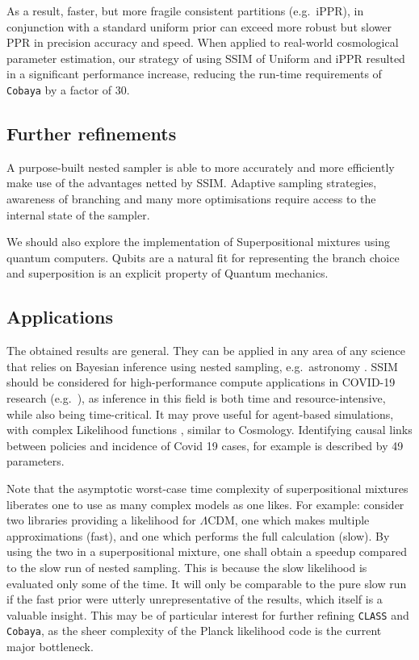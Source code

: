 \documentclass[usenatbib]{mnras}
\begin{document}
As a result, faster, but more fragile consistent partitions
(e.g.~iPPR), in conjunction with a standard uniform prior can exceed
more robust but slower PPR in precision accuracy and speed.  When
applied to real-world cosmological parameter estimation, our strategy
of using SSIM of Uniform and iPPR resulted in a significant
performance increase, reducing the run-time requirements of
\texttt{Cobaya} by a factor of 30.

\subsection{Further refinements}\label{sec:org8314ddf}

A purpose-built nested sampler is able to more accurately and more
efficiently make use of the advantages netted by SSIM. Adaptive
sampling strategies, awareness of branching and many more
optimisations require access to the internal state of the sampler. 

We should also explore the implementation of Superpositional mixtures
using quantum computers. Qubits are a natural fit for representing the
branch choice and superposition is an explicit property of Quantum
mechanics.

\subsection{Applications}\label{sec:applications}
The obtained results are general. They can be applied in any area of
any science that relies on Bayesian inference using nested sampling,
e.g.~astronomy \citep{Casado_2016}. SSIM should be considered for
high-performance compute applications in COVID-19 research
(e.g.~\cite{Covid1,Covid2}), as inference in this field is both time
and resource-intensive, while also being time-critical. It may prove
useful for agent-based simulations, with complex Likelihood functions
\citep{Covid2}, similar to Cosmology. Identifying causal links between
policies and incidence of Covid 19 cases, for example is described by
49 parameters.

Note that the asymptotic worst-case time complexity of superpositional
mixtures liberates one to use as many complex models as one likes. For
example: consider two libraries providing a likelihood for
\(\Lambda\)CDM, one which makes multiple approximations (fast), and
one which performs the full calculation (slow). By using the two in a
superpositional mixture, one shall obtain a speedup compared to the
slow run of nested sampling. This is because the slow likelihood is
evaluated only some of the time. It will only be comparable to the
pure slow run if the fast prior were utterly unrepresentative of the
results, which itself is a valuable insight. This may be of particular
interest for further refining \texttt{CLASS} and \texttt{Cobaya}, as
the sheer complexity of the Planck likelihood code is the current
major bottleneck.
\end{document}
